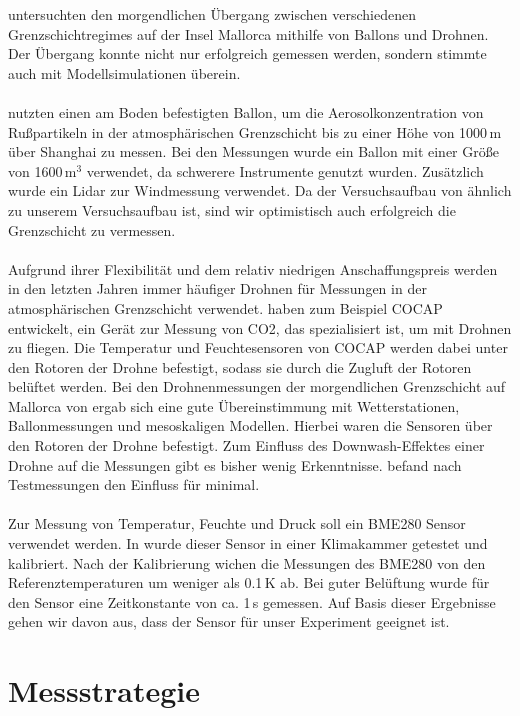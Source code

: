 \documentclass[a4paper,11pt,DIV=calc,tablecaptionabove,headinclude,twoside]{article}
\begin{document}
\citet{jimenez2016morning} untersuchten den morgendlichen Übergang zwischen verschiedenen Grenzschichtregimes auf der Insel Mallorca mithilfe von Ballons und Drohnen. Der Übergang konnte nicht nur erfolgreich gemessen werden, sondern stimmte auch mit Modellsimulationen überein.\\\\ 
\citet{Li2015TetheredBB} nutzten einen am Boden befestigten Ballon, um die Aerosolkonzentration von Rußpartikeln in der atmosphärischen Grenzschicht bis zu einer Höhe von 1000\,m über Shanghai zu messen. Bei den Messungen wurde ein Ballon mit einer Größe von 1600\,m$^{3}$ verwendet, da schwerere Instrumente genutzt wurden. Zusätzlich wurde ein Lidar zur Windmessung verwendet. Da der Versuchsaufbau von \citet{Li2015TetheredBB} ähnlich zu unserem Versuchsaufbau ist, sind wir optimistisch auch erfolgreich die Grenzschicht zu vermessen.\\\\
Aufgrund ihrer Flexibilität und dem relativ niedrigen Anschaffungspreis werden
in den letzten Jahren immer häufiger Drohnen für Messungen in der atmosphärischen Grenzschicht verwendet. \citet{kunz2018cocap} haben zum Beispiel COCAP entwickelt, ein Gerät zur Messung von CO2, das spezialisiert ist, um mit Drohnen zu fliegen. Die Temperatur und Feuchtesensoren von COCAP werden dabei unter den Rotoren der Drohne befestigt, sodass sie durch die 
Zugluft der Rotoren belüftet werden. Bei den Drohnenmessungen  der morgendlichen Grenzschicht auf Mallorca von \citet{jimenez2016morning} ergab sich eine gute Übereinstimmung mit Wetterstationen, Ballonmessungen und mesoskaligen Modellen. Hierbei waren die Sensoren über den Rotoren
der Drohne befestigt. Zum Einfluss des Downwash-Effektes einer Drohne auf die Messungen gibt es bisher wenig Erkenntnisse. \citet{zhou2017small} befand nach Testmessungen den Einfluss für minimal.\\\\
Zur Messung von Temperatur, Feuchte und Druck soll ein BME280 Sensor verwendet werden. In \citet{otte2018cost} wurde dieser Sensor in einer Klimakammer getestet und kalibriert. Nach der Kalibrierung wichen die Messungen des BME280 von den Referenztemperaturen um weniger als 0.1\,K ab. Bei guter Belüftung wurde für den Sensor eine Zeitkonstante von ca. 1\,s gemessen. Auf Basis dieser Ergebnisse gehen wir davon aus, dass der Sensor für unser Experiment geeignet ist.  

\section{Messstrategie}
\end{document}
